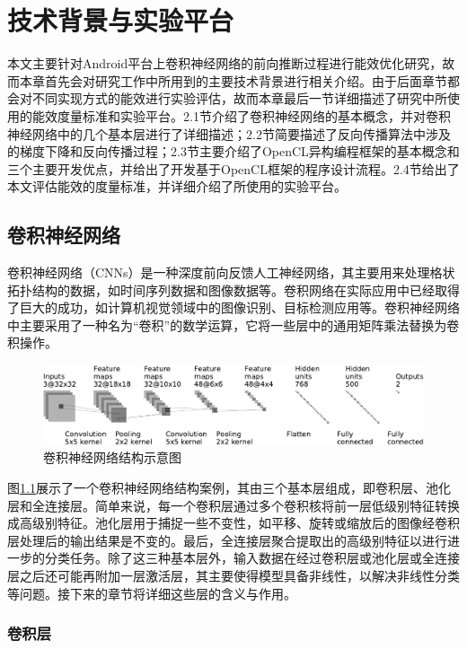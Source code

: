 \chapter{技术背景与实验平台}
本文主要针对Android平台上卷积神经网络的前向推断过程进行能效优化研究，故而本章首先会对研究工作中所用到的主要技术背景进行相关介绍。由于后面章节都会对不同实现方式的能效进行实验评估，故而本章最后一节详细描述了研究中所使用的能效度量标准和实验平台。2.1节介绍了卷积神经网络的基本概念，并对卷积神经网络中的几个基本层进行了详细描述；2.2节简要描述了反向传播算法中涉及的梯度下降和反向传播过程；2.3节主要介绍了OpenCL异构编程框架的基本概念和三个主要开发优点，并给出了开发基于OpenCL框架的程序设计流程。2.4节给出了本文评估能效的度量标准，并详细介绍了所使用的实验平台。

\section{卷积神经网络}
卷积神经网络（CNNs）是一种深度前向反馈人工神经网络，其主要用来处理格状拓扑结构的数据，如时间序列数据和图像数据等。卷积网络在实际应用中已经取得了巨大的成功，如计算机视觉领域中的图像识别、目标检测应用等。卷积神经网络中主要采用了一种名为“卷积”的数学运算，它将一些层中的通用矩阵乘法替换为卷积操作。

\begin{figure}[htbp]
    \includegraphics[width=1\textwidth]{figures/convnet_fig_cropped.pdf}
    \caption{卷积神经网络结构示意图 \cite{github.com}}\label{figure:figure1}
\end{figure}

图\ref{figure:figure1}展示了一个卷积神经网络结构案例，其由三个基本层组成，即卷积层、池化层和全连接层。简单来说，每一个卷积层通过多个卷积核将前一层低级别特征转换成高级别特征。池化层用于捕捉一些不变性，如平移、旋转或缩放后的图像经卷积层处理后的输出结果是不变的。最后，全连接层聚合提取出的高级别特征以进行进一步的分类任务。除了这三种基本层外，输入数据在经过卷积层或池化层或全连接层之后还可能再附加一层激活层，其主要使得模型具备非线性，以解决非线性分类等问题。接下来的章节将详细这些层的含义与作用。

\subsection{卷积层}
